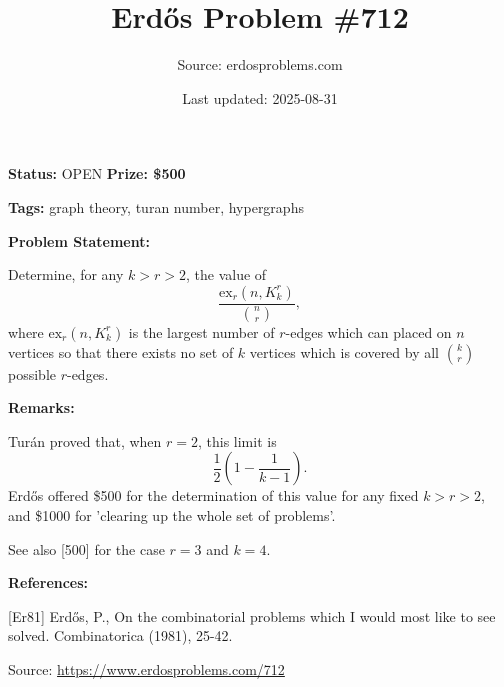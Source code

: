 \documentclass{article}
\title{Erd\H{o}s Problem \#712}
\date{Last updated: 2025-08-31}
\author{Source: erdosproblems.com}
\begin{document}
\maketitle

\noindent\textbf{Status:} OPEN \quad \textbf{Prize: \$500}

\noindent\textbf{Tags:} graph theory, turan number, hypergraphs

\medskip
\noindent\textbf{Problem Statement:}

Determine, for any $k>r>2$, the value of\[\frac{\mathrm{ex}_r(n,K_k^r)}{\binom{n}{r}},\]where $\mathrm{ex}_r(n,K_k^r)$ is the largest number of $r$-edges which can placed on $n$ vertices so that there exists no set of $k$ vertices which is covered by all $\binom{k}{r}$ possible $r$-edges.

\bigskip
\noindent\textbf{Remarks:}

Tur\'{an proved} that, when $r=2$, this limit is\[\frac{1}{2}\left(1-\frac{1}{k-1}\right).\]Erd\H{o}s \cite{Er81} offered \$500 for the determination of this value for any fixed $k>r>2$, and \$1000 for 'clearing up the whole set of problems'.

See also [500] for the case $r=3$ and $k=4$.

\bigskip
\noindent\textbf{References:}

[Er81] Erd\H{o}s, P., On the combinatorial problems which I would most like to see solved. Combinatorica (1981), 25-42.

\bigskip
\noindent\small{Source: \url{https://www.erdosproblems.com/712}}
\end{document}
